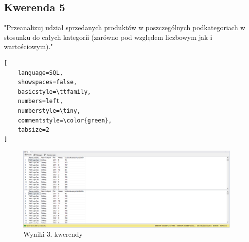 \documentclass[a4paper,12pt]{article}
\begin{document}
\subsection{Kwerenda 5}

"Przeanalizuj udział sprzedanych produktów w poszczególnych podkategoriach w stosunku do całych kategorii (zarówno pod względem liczbowym jak i wartościowym)."

{\small
\begin{lstlisting}[
	language=SQL,
	showspaces=false,
	basicstyle=\ttfamily,
	numbers=left,
	numberstyle=\tiny,
	commentstyle=\color{green},
	tabsize=2
]
\end{lstlisting}}

\begin{figure}[H]
	\centering
	\includegraphics[width=1.0\textwidth]{images/3.png}
	\caption{Wyniki 3. kwerendy}
\end{figure}
\end{document}
